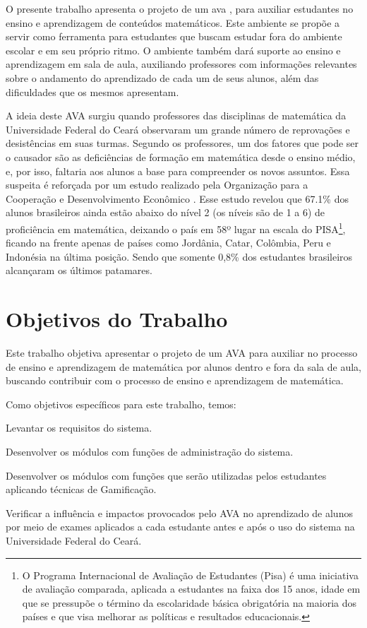 O presente trabalho apresenta o projeto de um \gls{ava} \cite{valentini2010aprendizagem}, para auxiliar 
estudantes no ensino e aprendizagem de conteúdos matemáticos. Este ambiente se propõe a servir como ferramenta para estudantes que buscam 
estudar fora do ambiente escolar e em seu próprio ritmo. O ambiente também dará suporte ao ensino e aprendizagem em sala de aula, 
auxiliando professores com informações relevantes sobre o andamento do aprendizado de cada um de seus alunos, além das dificuldades que os 
mesmos apresentam.

A ideia deste AVA surgiu quando professores das disciplinas de matemática da Universidade Federal do Cear\'a observaram um grande número de 
reprovações e desistências em suas turmas. Segundo os professores, um dos fatores que pode ser o causador são as deficiências de formação em 
matemática desde o ensino médio, e, por isso, faltaria aos alunos a base para compreender os novos assuntos. Essa suspeita é reforçada por 
um estudo realizado pela Organização para a Cooperação e Desenvolvimento Econômico \cite{pisainfocus2016}. Esse estudo revelou que 67.1\% 
dos alunos brasileiros ainda estão abaixo do nível 2 (os níveis são de 1 a 6) de proficiência em matem\'atica, deixando o país em 58º lugar 
na escala do PISA\footnote{O 
Programa Internacional de Avaliação de Estudantes (Pisa) é uma iniciativa de avaliação comparada, aplicada a estudantes na faixa dos 15 
anos, idade em que se pressupõe o término da escolaridade básica obrigatória na maioria dos países e que visa melhorar as políticas e 
resultados educacionais.}, ficando na frente apenas de países como Jordânia, Catar, Colômbia, Peru e Indonésia na \'ultima posi\c{c}\~ao. 
Sendo que somente 0,8\% dos estudantes brasileiros alcançaram os últimos patamares.

\section{Objetivos do Trabalho}

Este trabalho objetiva apresentar o projeto de um AVA para auxiliar no processo de ensino e aprendizagem de matemática por alunos dentro e 
fora da sala de aula, buscando contribuir com o processo de ensino e aprendizagem de matem\'atica. 

Como objetivos específicos para este trabalho, temos: 
\begin{alineas}
  \item Levantar os requisitos do sistema.
  \item Desenvolver os módulos com funções de administração do sistema.
  \item Desenvolver os módulos com funções que serão utilizadas pelos estudantes aplicando técnicas de Gamificação.
  \item Verificar a influência e impactos provocados pelo AVA no aprendizado de alunos por meio de exames aplicados a 
cada estudante antes e após o uso do sistema na Universidade Federal do Ceará.
\end{alineas}


